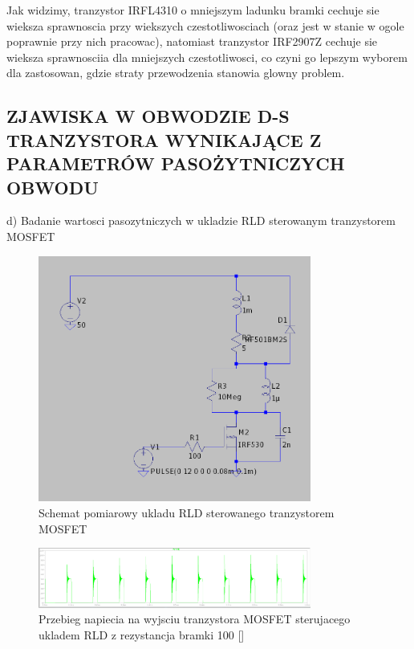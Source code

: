 \documentclass[11pt]{article}
\begin{document}
Jak widzimy, tranzystor IRFL4310 o mniejszym ladunku bramki cechuje sie wieksza sprawnoscia przy wiekszych czestotliwosciach (oraz jest w stanie w ogole poprawnie przy nich pracowac), natomiast tranzystor IRF2907Z
cechuje sie wieksza sprawnosciia dla mniejszych czestotliwosci, co czyni go lepszym wyborem dla zastosowan, gdzie
straty przewodzenia stanowia glowny problem.\\

\subsection{ZJAWISKA W OBWODZIE D-S TRANZYSTORA WYNIKAJĄCE Z PARAMETRÓW PASOŻYTNICZYCH OBWODU}

d) Badanie wartosci pasozytniczych w ukladzie RLD sterowanym tranzystorem MOSFET

\begin{figure}[H]
\centering
\includegraphics[width=0.8\textwidth]{aun1_rld_without_snubber.png}
\caption{Schemat pomiarowy ukladu RLD sterowanego tranzystorem MOSFET}
\end{figure}

\begin{figure}[H]
\centering
\includegraphics[width=0.8\textwidth]{aun1_rld_without_snubber_rgate100ohm.png}
\caption{Przebieg napiecia na wyjsciu tranzystora MOSFET sterujacego ukladem RLD z rezystancja bramki 100 [\Omega]}
\end{figure}
\end{document}
